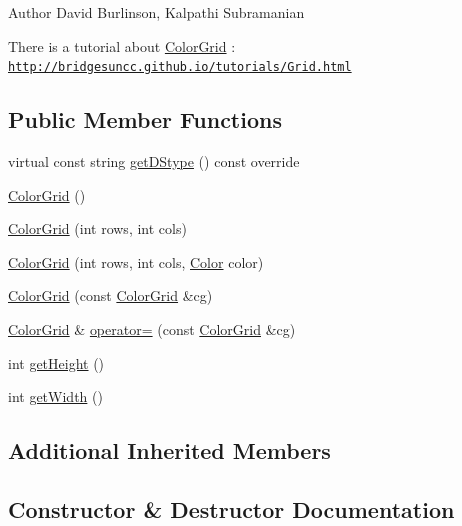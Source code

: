 \begin{DoxyAuthor}{Author}
David Burlinson, Kalpathi Subramanian
\end{DoxyAuthor}
There is a tutorial about \hyperlink{classbridges_1_1datastructure_1_1_color_grid}{Color\+Grid} \+: \href{http://bridgesuncc.github.io/tutorials/Grid.html}{\tt http\+://bridgesuncc.\+github.\+io/tutorials/\+Grid.\+html} \subsection*{Public Member Functions}
\begin{DoxyCompactItemize}
\item 
virtual const string \hyperlink{classbridges_1_1datastructure_1_1_color_grid_afad945d648b427ca183a1dface8249b7}{get\+D\+Stype} () const override
\item 
\hyperlink{classbridges_1_1datastructure_1_1_color_grid_afe6bd7f8bf0dddd889ad7b6c159e928a}{Color\+Grid} ()
\item 
\hyperlink{classbridges_1_1datastructure_1_1_color_grid_a96a8df5eab72fb32c358ba12f2d4483b}{Color\+Grid} (int rows, int cols)
\item 
\hyperlink{classbridges_1_1datastructure_1_1_color_grid_a28f65f52274748d314ee47089e961c2c}{Color\+Grid} (int rows, int cols, \hyperlink{classbridges_1_1datastructure_1_1_color}{Color} color)
\item 
\hyperlink{classbridges_1_1datastructure_1_1_color_grid_adf9b21649638aec97394825d6d09f34c}{Color\+Grid} (const \hyperlink{classbridges_1_1datastructure_1_1_color_grid}{Color\+Grid} \&cg)
\item 
\hyperlink{classbridges_1_1datastructure_1_1_color_grid}{Color\+Grid} \& \hyperlink{classbridges_1_1datastructure_1_1_color_grid_abb8b358357bdccbd22fea5cea4a9862e}{operator=} (const \hyperlink{classbridges_1_1datastructure_1_1_color_grid}{Color\+Grid} \&cg)
\item 
int \hyperlink{classbridges_1_1datastructure_1_1_color_grid_ab437905ec904f941cd58d3393c3a5700}{get\+Height} ()
\item 
int \hyperlink{classbridges_1_1datastructure_1_1_color_grid_a46b358c31927e34f2068202e0cc23ae0}{get\+Width} ()
\end{DoxyCompactItemize}
\subsection*{Additional Inherited Members}


\subsection{Constructor \& Destructor Documentation}
\mbox{\label{classbridges_1_1datastructure_1_1_color_grid_afe6bd7f8bf0dddd889ad7b6c159e928a}} 
